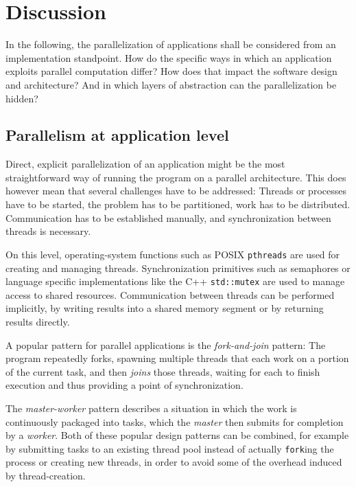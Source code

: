 \documentclass[BCOR20mm,DIV14,10pt,headinclude,footexclude,bibtotoc,liststotoc]{article}
\begin{document}
\section{Discussion}

In the following, the parallelization of applications shall be considered from
an implementation standpoint. How do the specific ways in which an application
exploits parallel computation differ? How does that impact the software design
and architecture? And in which layers of abstraction can the parallelization be
hidden?



\subsection{Parallelism at application level}

Direct, explicit parallelization of an application might be the most
straightforward way of running the program on a parallel architecture. This does
however mean that several challenges have to be addressed: Threads or processes
have to be started, the problem has to be partitioned, work has to be
distributed. Communication has to be established manually, and synchronization
between threads is necessary.

On this level, operating-system functions such as POSIX \texttt{pthreads} are
used for creating and managing threads. Synchronization primitives such as
semaphores or language specific implementations like the C++ \texttt{std::mutex}
are used to manage access to shared resources. Communication between threads can
be performed implicitly, by writing results into a shared memory segment or by
returning results directly.

A popular pattern for parallel applications is the \emph{fork-and-join} pattern:
The program repeatedly forks, spawning multiple threads that each work on a
portion of the current task, and then \emph{joins} those threads, waiting for
each to finish execution and thus providing a point of synchronization.

The \emph{master-worker} pattern describes a situation in which the work is
continuously packaged into tasks, which the \emph{master} then submits for
completion by a \emph{worker}. Both of these popular design patterns can be
combined, for example by submitting tasks to an existing thread pool instead of
actually \texttt{fork}ing the process or creating new threads, in order to avoid
some of the overhead induced by thread-creation.
\end{document}
